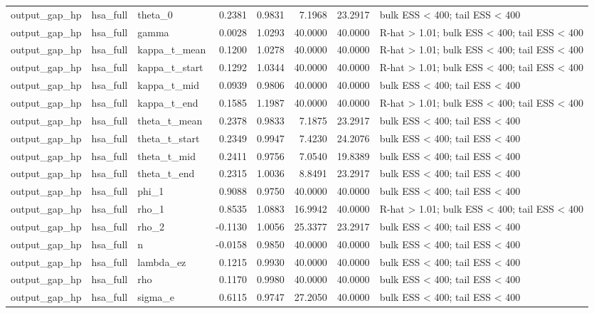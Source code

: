 \begin{tabular}{lllrrrrl}
output\_gap\_hp & hsa\_full & theta\_0 & 0.2381 & 0.9831 & 7.1968 & 23.2917 & bulk ESS < 400; tail ESS < 400 \\
output\_gap\_hp & hsa\_full & gamma & 0.0028 & 1.0293 & 40.0000 & 40.0000 & R-hat > 1.01; bulk ESS < 400; tail ESS < 400 \\
output\_gap\_hp & hsa\_full & kappa\_t\_mean & 0.1200 & 1.0278 & 40.0000 & 40.0000 & R-hat > 1.01; bulk ESS < 400; tail ESS < 400 \\
output\_gap\_hp & hsa\_full & kappa\_t\_start & 0.1292 & 1.0344 & 40.0000 & 40.0000 & R-hat > 1.01; bulk ESS < 400; tail ESS < 400 \\
output\_gap\_hp & hsa\_full & kappa\_t\_mid & 0.0939 & 0.9806 & 40.0000 & 40.0000 & bulk ESS < 400; tail ESS < 400 \\
output\_gap\_hp & hsa\_full & kappa\_t\_end & 0.1585 & 1.1987 & 40.0000 & 40.0000 & R-hat > 1.01; bulk ESS < 400; tail ESS < 400 \\
output\_gap\_hp & hsa\_full & theta\_t\_mean & 0.2378 & 0.9833 & 7.1875 & 23.2917 & bulk ESS < 400; tail ESS < 400 \\
output\_gap\_hp & hsa\_full & theta\_t\_start & 0.2349 & 0.9947 & 7.4230 & 24.2076 & bulk ESS < 400; tail ESS < 400 \\
output\_gap\_hp & hsa\_full & theta\_t\_mid & 0.2411 & 0.9756 & 7.0540 & 19.8389 & bulk ESS < 400; tail ESS < 400 \\
output\_gap\_hp & hsa\_full & theta\_t\_end & 0.2315 & 1.0036 & 8.8491 & 23.2917 & bulk ESS < 400; tail ESS < 400 \\
output\_gap\_hp & hsa\_full & phi\_1 & 0.9088 & 0.9750 & 40.0000 & 40.0000 & bulk ESS < 400; tail ESS < 400 \\
output\_gap\_hp & hsa\_full & rho\_1 & 0.8535 & 1.0883 & 16.9942 & 40.0000 & R-hat > 1.01; bulk ESS < 400; tail ESS < 400 \\
output\_gap\_hp & hsa\_full & rho\_2 & -0.1130 & 1.0056 & 25.3377 & 23.2917 & bulk ESS < 400; tail ESS < 400 \\
output\_gap\_hp & hsa\_full & n & -0.0158 & 0.9850 & 40.0000 & 40.0000 & bulk ESS < 400; tail ESS < 400 \\
output\_gap\_hp & hsa\_full & lambda\_ez & 0.1215 & 0.9930 & 40.0000 & 40.0000 & bulk ESS < 400; tail ESS < 400 \\
output\_gap\_hp & hsa\_full & rho & 0.1170 & 0.9980 & 40.0000 & 40.0000 & bulk ESS < 400; tail ESS < 400 \\
output\_gap\_hp & hsa\_full & sigma\_e & 0.6115 & 0.9747 & 27.2050 & 40.0000 & bulk ESS < 400; tail ESS < 400 \\

\end{tabular}
